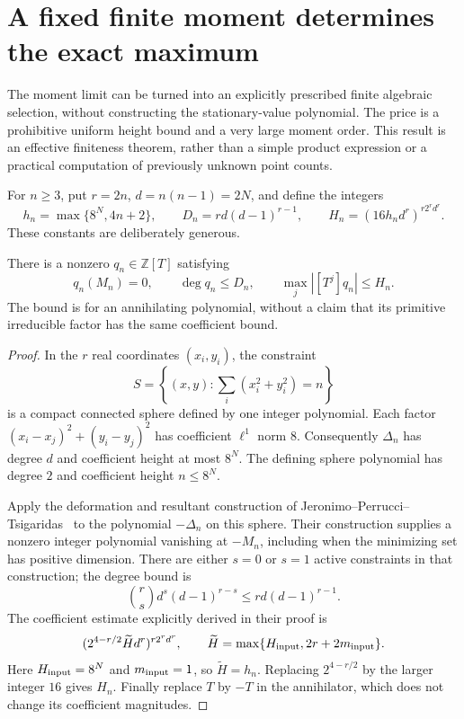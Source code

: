 \section{A fixed finite moment determines the exact maximum}
\label{sec:fixed-moment-reconstruction}

The moment limit can be turned into an explicitly prescribed finite
algebraic selection, without constructing the stationary-value polynomial.
The price is a prohibitive uniform height bound and a very large moment
order. This result is an effective finiteness theorem, rather than a
simple product expression or a practical computation of previously
unknown point counts.

For $n\ge3$, put $r=2n$, $d=n(n-1)=2N$, and define the integers
\begin{equation}\label{eq:uniform-height-constants}
 h_n=\max\{8^N,4n+2\},\qquad
 D_n=rd(d-1)^{r-1},\qquad
 H_n=(16h_nd^r)^{r2^rd^r}.
\end{equation}
These constants are deliberately generous.

\begin{lemma}
\label{lem:uniform-height-bound}
There is a nonzero $q_n\in\mathbb Z[T]$ satisfying
\[
 q_n(M_n)=0,\qquad \deg q_n\le D_n,\qquad
 \max_j|[T^j]q_n|\le H_n.
\]
The bound is for an annihilating polynomial, without a claim that its
primitive irreducible factor has the same coefficient bound.
\end{lemma}
\begin{proof}
In the $r$ real coordinates $(x_i,y_i)$, the constraint
\[
 S=\left\{(x,y):\sum_i(x_i^2+y_i^2)=n\right\}
\]
is a compact connected sphere defined by one integer polynomial.
Each factor $(x_i-x_j)^2+(y_i-y_j)^2$ has coefficient $\ell^1$ norm $8$.
Consequently $\Delta_n$ has degree $d$ and coefficient height at most
$8^N$. The defining sphere polynomial has degree $2$ and coefficient
height $n\le8^N$.

Apply the deformation and resultant construction of
Jeronimo--Perrucci--Tsigaridas~\cite[Proposition~2.7 and the proof of
Theorem~1.1]{JPT} to the polynomial $-\Delta_n$ on this sphere.
Their construction supplies a nonzero integer polynomial vanishing at
$-M_n$, including when the minimizing set has positive dimension.
There are either $s=0$ or $s=1$ active constraints in that construction;
the degree bound is
\[
 \binom rs d^s(d-1)^{r-s}\le rd(d-1)^{r-1}.
\]
The coefficient estimate explicitly derived in their proof is
\[
 (2^{4-r/2}\widetilde H d^r)^{r2^rd^r},\qquad
 \widetilde H=\max\{H_{\rm input},2r+2m_{\rm input}\}.
\]
Here $H_{\rm input}=8^N$ and $m_{\rm input}=1$, so
$\widetilde H=h_n$. Replacing $2^{4-r/2}$ by the larger integer $16$
gives $H_n$. Finally replace $T$ by $-T$ in the annihilator, which
does not change its coefficient magnitudes.
\end{proof}

